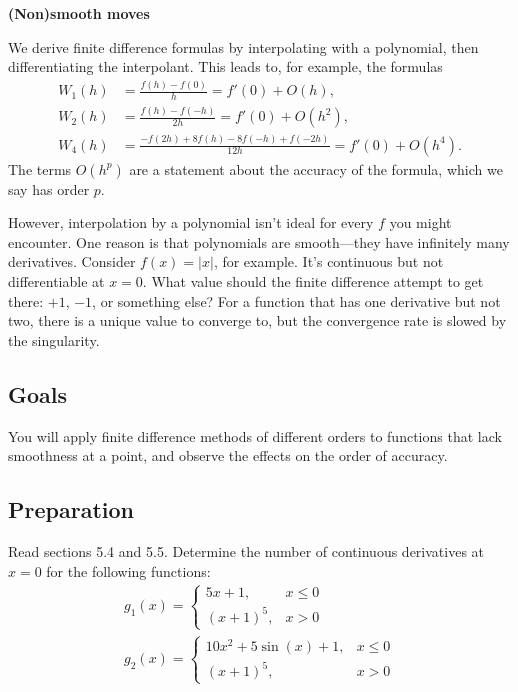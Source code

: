 \documentclass[11pt,twoside]{article}
\begin{document}
\begin{center}
  \bf (Non)smooth moves
\end{center}

We derive finite difference formulas by interpolating with a polynomial, then differentiating the interpolant. This leads to, for example, the formulas
\begin{align}
   W_1(h) &=  \frac{f(h)-f(0)}{h} = f'(0) + O(h), \label{W1} \\
   W_2(h) &=  \frac{f(h)-f(-h)}{2h} = f'(0) + O(h^2), \label{W2} \\
   W_4(h) &=  \frac{-f(2h) + 8f(h)-8f(-h)+f(-2h)}{12h} = f'(0) + O(h^4). \label{W4}
\end{align}
The terms $O(h^p)$ are a statement about the accuracy of the formula, which we say has order $p$.

However, interpolation by a polynomial isn't ideal for every $f$ you might encounter. One reason is that polynomials are smooth---they have infinitely many derivatives. Consider $f(x)=|x|$, for example. It's continuous but not differentiable at $x=0$. What value should the finite difference attempt to get there: $+1$, $-1$, or something else? For a function that has one derivative but not two, there is a unique value to converge to, but the convergence rate is slowed by the singularity. 

\subsection*{Goals}

You will apply finite difference methods of different orders to 
functions that lack smoothness at a point, and observe the effects on
the order of accuracy.

\subsection*{Preparation}

Read sections 5.4 and 5.5. Determine the number of continuous derivatives at $x=0$ for the following functions:
\begin{align}
  g_1(x) =
  \begin{cases}
    5x+1, & x \le 0 \\ (x+1)^5, & x > 0
  \end{cases}  \label{g1} \\
  g_2(x) =
  \begin{cases}
    10x^2 + 5\sin(x) + 1, & x \le 0 \\ (x+1)^5, & x>0
  \end{cases} \label{g2}
\end{align}
\end{document}
